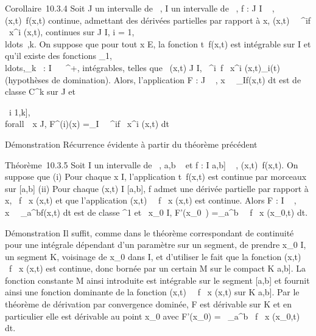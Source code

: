 \documentclass[]{article}
\begin{document}
Corollaire~10.3.4 Soit J un intervalle de ~, I un intervalle de ~, f : J
\times I \rightarrow~ , (x,t)\mapsto~f(x,t) continue, admettant des
dérivées partielles par rapport à x, (x,t)\mapsto~
\partial~^if \over \partial~x^i (x,t), continues
sur J \times I, i =
1,\\ldots~,k. On
suppose que pour tout x \in E, la fonction
t\mapsto~f(x,t) est intégrable sur I et qu'il existe
des fonctions
\phi\_1,\\ldots,\phi\_k~
: I \rightarrow~ ~^+, intégrables, telles que
\forall~(x,t) \in J \times I, \textbar{} \partial~^i~f
\over \partial~x^i (x,t)\textbar{}\leq \phi\_i(t)
(hypothèses de domination). Alors, l'application F : J \rightarrow~ ,
x\mapsto~\int ~
\_If(x,t) dt est de classe C^k sur J et

\forall~i \in {[}1,k{]}, \\forall~~x \in
J, F^(i)(x) =\int  \_I~
\partial~^if \over \partial~x^i (x,t) dt

Démonstration Récurrence évidente à partir du théorème précédent

Théorème~10.3.5 Soit I un intervalle de ~, a,b \in {}~ et f : I \times {[}a,b{]}
\rightarrow~ , (x,t)\mapsto~f(x,t). On suppose que (i) Pour
chaque x \in I, l'application t\mapsto~f(x,t) est
continue par morceaux sur {[}a,b{]} (ii) Pour chaque (x,t) \in I \times
{[}a,b{]}, f admet une dérivée partielle par rapport à x,  \partial~f
\over \partial~x (x,t) et que l'application
(x,t)\mapsto~ \partial~f \over \partial~x (x,t)
est continue. Alors F : I \rigtharrow~ ,
x\mapsto~\int ~
\_a^bf(x,t) dt est de classe ^1 et
\forall~x\_0 \in I, F'(x\_0~)
=\int  \_a^b~ \partial~f
\over \partial~x (x\_0,t) dt.

Démonstration Il suffit, comme dans le théorème correspondant de
continuité pour une intégrale dépendant d'un paramètre sur un segment,
de prendre x\_0 \in I, un segment K, voisinage de x\_0
dans I, et d'utiliser le fait que la fonction
(x,t)\mapsto~ \partial~f \over \partial~x (x,t)
est continue, donc bornée par un certain M sur le compact K \times {[}a,b{]}.
La fonction constante M ainsi introduite est intégrable sur le segment
{[}a,b{]} et fournit ainsi une fonction dominante de la fonction
(x,t)\mapsto~ \partial~f \over \partial~x (x,t)
sur K \times {[}a,b{]}. Par le théorème de dérivation par convergence
dominée, F est dérivable sur K et en particulier elle est dérivable au
point x\_0 avec F'(x\_0) =\int ~
\_a^b \partial~f \over \partial~x (x\_0,t) dt.
\end{document}
